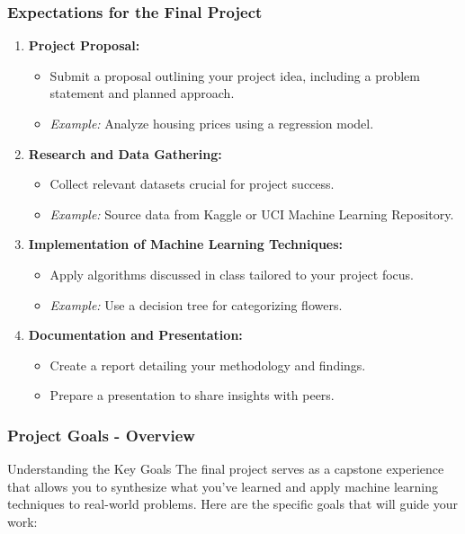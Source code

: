 \documentclass[aspectratio=169]{beamer}
\begin{document}
\begin{frame}[fragile]
    \frametitle{Expectations for the Final Project}
    \begin{enumerate}
        \item \textbf{Project Proposal:}
            \begin{itemize}
                \item Submit a proposal outlining your project idea, including a problem statement and planned approach.
                \item \textit{Example:} Analyze housing prices using a regression model.
            \end{itemize}
            
        \item \textbf{Research and Data Gathering:}
            \begin{itemize}
                \item Collect relevant datasets crucial for project success.
                \item \textit{Example:} Source data from Kaggle or UCI Machine Learning Repository.
            \end{itemize}

        \item \textbf{Implementation of Machine Learning Techniques:}
            \begin{itemize}
                \item Apply algorithms discussed in class tailored to your project focus.
                \item \textit{Example:} Use a decision tree for categorizing flowers.
            \end{itemize}

        \item \textbf{Documentation and Presentation:}
            \begin{itemize}
                \item Create a report detailing your methodology and findings.
                \item Prepare a presentation to share insights with peers.
            \end{itemize}
    \end{enumerate}
\end{frame}

\begin{frame}[fragile]
    \frametitle{Project Goals - Overview}
    \begin{block}{Understanding the Key Goals}
        The final project serves as a capstone experience that allows you to synthesize what you’ve learned and apply machine learning techniques to real-world problems. Here are the specific goals that will guide your work:
    \end{block}
\end{frame}
\end{document}
